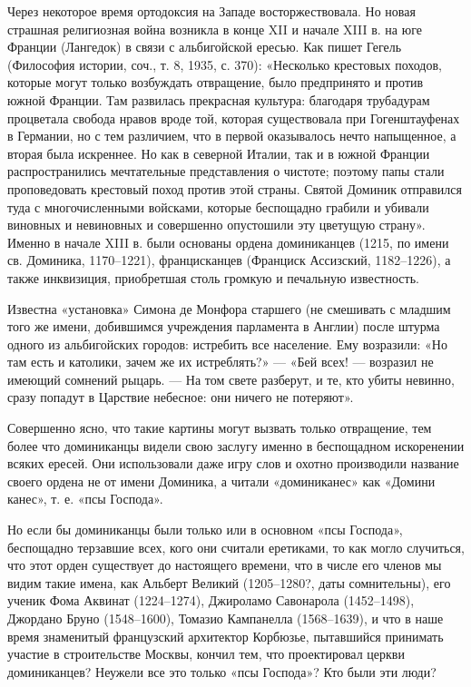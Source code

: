 Через некоторое время ортодоксия на Западе восторжествовала. Но новая страшная
религиозная война возникла в конце XII и начале XIII в. на юге Франции
(Лангедок) в связи с альбигойской ересью. Как пишет Гегель (Философия истории,
соч., т. 8, 1935, с. 370): «Несколько крестовых походов, которые могут только
возбуждать отвращение, было предпринято и против южной Франции. Там развилась
прекрасная культура: благодаря трубадурам процветала свобода нравов вроде той,
которая существовала при Гогенштауфенах в Германии, но с тем различием, что в
первой оказывалось нечто напыщенное, а вторая была искреннее. Но как в северной
Италии, так и в южной Франции распространились мечтательные представления о
чистоте; поэтому папы стали проповедовать крестовый поход против этой страны.
Святой Доминик отправился туда с многочисленными войсками, которые беспощадно
грабили и убивали виновных и невиновных и совершенно опустошили эту цветущую
страну». Именно в начале XIII в. были основаны ордена доминиканцев (1215, по
имени св. Доминика, 1170--1221), францисканцев (Франциск Ассизский, 1182--1226),
а также инквизиция, приобретшая столь громкую и печальную известность.

Известна «установка» Симона де Монфора старшего (не смешивать с младшим того же
имени, добившимся учреждения парламента в Англии) после штурма одного из
альбигойских городов: истребить все население. Ему возразили: «Но там есть и
католики, зачем же их
истреблять?» --- «Бей всех! --- возразил не имеющий сомнений рыцарь. --- На том свете
разберут, и те, кто убиты невинно, сразу попадут в Царствие небесное: они
ничего не потеряют».

Совершенно ясно, что такие картины могут вызвать только отвращение, тем более
что доминиканцы видели свою заслугу именно в беспощадном искоренении всяких
ересей. Они использовали даже игру слов и охотно производили название своего
ордена не от имени Доминика, а читали «доминиканес» как «Домини канес», т. е.
«псы Господа».

Но если бы доминиканцы были только или в основном «псы Господа», беспощадно
терзавшие всех, кого они считали еретиками, то как могло случиться, что этот
орден существует до настоящего времени, что в числе его членов мы видим такие
имена, как Альберт Великий (1205--1280?, даты сомнительны), его ученик Фома
Аквинат (1224--1274), Джироламо Савонарола (1452--1498), Джордано Бруно
(1548--1600), Томазио Кампанелла (1568--1639), и что в наше время знаменитый
французский архитектор Корбюзье, пытавшийся принимать участие в строительстве
Москвы, кончил тем, что проектировал церкви доминиканцев? Неужели все это
только «псы Господа»? Кто были эти люди?

